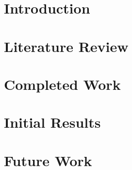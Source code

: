 \documentclass[a4paper,11pt,twoside]{report}
\author{\me}
\begin{document}


\normalsize

%

\begingroup
    \singlespacing
    \tableofcontents
\endgroup

\doublespacing
\chapter{Introduction}\label{chapter:Introduction}
\setcounter{page}{0}


\chapter{Literature Review}\label{chapter:Literature Review}


\begingroup
\renewcommand{\cleardoublepage}{}
\renewcommand{\clearpage}{}
\vspace{33pt}
\chapter{Completed Work}\label{chapter:Completed Work}
\endgroup


\chapter{Initial Results}\label{chapter:Initial Results}


\chapter{Future Work}\label{chapter:Future Work}


%

\begingroup
    \singlespacing
    
    
\endgroup
\end{document}
